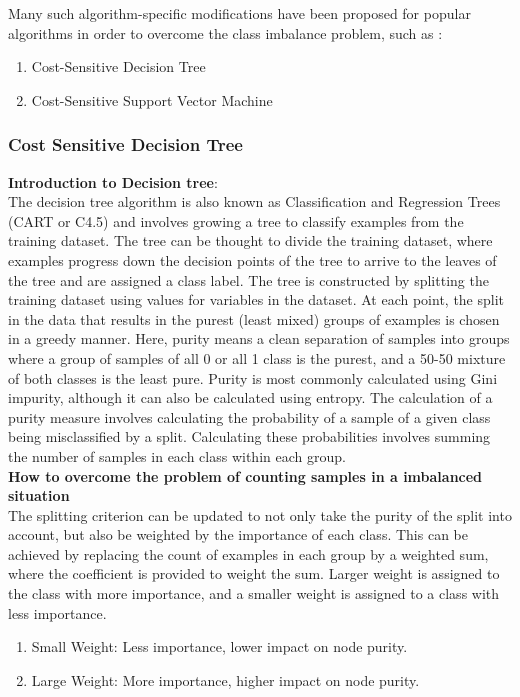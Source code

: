 Many such algorithm-specific modifications have been proposed for popular algorithms in order to overcome the class imbalance problem, such as :  
\begin{enumerate}
\item{Cost-Sensitive Decision Tree } 
\item{Cost-Sensitive Support Vector Machine}  
\end{enumerate}

\subsubsection{Cost Sensitive Decision Tree} 
\textbf{Introduction to Decision tree}: \\
The decision tree algorithm is also known as Classification and Regression Trees (CART or C4.5) and involves growing a tree to classify examples from the training dataset.
The tree can be thought to divide the training dataset, where examples progress down the decision points of the tree to arrive to the leaves of the tree and are assigned a class label.
The tree is constructed by splitting the training dataset using values for variables in the dataset. At each point, the split in the data that results in the purest (least mixed) groups of examples is chosen in a greedy manner.
Here, purity means a clean separation of samples into groups where a group of samples of all 0 or all 1 class is the purest, and a 50-50 mixture of both classes is the least pure. Purity is most commonly calculated using Gini impurity, although it can also be calculated using entropy.
The calculation of a purity measure involves calculating the probability of a sample of a given class being misclassified by a split. Calculating these probabilities involves summing the number of samples in each class within each group. \\


\textbf{How to overcome the problem of counting samples in a imbalanced situation} \\

The splitting criterion can be updated to not only take the purity of the split into account, but also be weighted by the importance of each class.
This can be achieved by replacing the count of examples in each group by a weighted sum, where the coefficient is provided to weight the sum.
Larger weight is assigned to the class with more importance, and a smaller weight is assigned to a class with less importance.  
\begin{enumerate}
\item{Small Weight: Less importance, lower impact on node purity.}
\item{Large Weight: More importance, higher impact on node purity.}
\end{enumerate}

